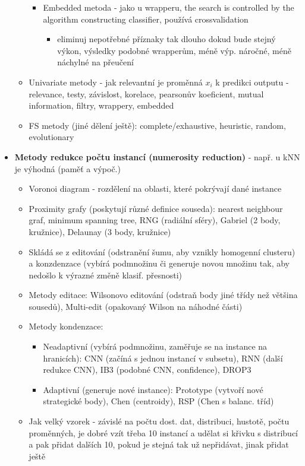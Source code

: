 \documentclass[a4paper,hidelinks]{article}
\begin{document}
\begin{itemize}
\begin{itemize}
\begin{itemize}
\begin{itemize}
                        \end{itemize}
                    \item Embedded metoda - jako u wrapperu, the search is controlled by the algorithm constructing classifier, používá crossvalidation
                        \begin{itemize}
                            \item eliminuj nepotřebné příznaky tak dlouho dokud bude stejný výkon, výsledky podobné wrapperům, méně výp. náročné, méně náchylné na přeučení
                        \end{itemize}
                \end{itemize}
            \item Univariate metody - jak relevantní je proměnná $x_i$ k predikci outputu - relevance, testy, závislost, korelace, pearsonův koeficient, mutual information, filtry, wrappery, embedded
            \item FS metody (jiné dělení ještě): complete/exhaustive, heuristic, random, evolutionary
        \end{itemize}
    \item \textbf{Metody redukce počtu instancí (numerosity reduction)} - např. u kNN je výhodná (paměť a výpoč.)
        \begin{itemize}
            \item Voronoi diagram - rozdělení na oblasti, které pokrývají dané instance
            \item Proximity grafy (poskytují různé definice souseda): nearest neighbour graf, minimum spanning tree, RNG (radiální sféry), Gabriel (2 body, kružnice), Delaunay (3 body, kružnice)
            \item Skládá se z editování (odstranění šumu, aby vznikly homogenní clusteru) a konzdenzace (vybírá podmnožinu či generuje novou množinu tak, aby nedošlo k výrazné změně klasif. přesnosti)
            \item Metody editace: Wilsonovo editování (odstraň body jiné třídy než většina sousedů), Multi-edit (opakovaný Wilson na náhodné části)
            \item Metody kondenzace:
                \begin{itemize}
                    \item Neadaptivní (vybírá podmnožinu, zaměřuje se na instance na hranicích): CNN (začíná s jednou instancí v subsetu), RNN (další redukce CNN), IB3 (podobné CNN, confidence), DROP3
                    \item Adaptivní (generuje nové instance): Prototype (vytvoří nové strategické body), Chen (centroidy), RSP (Chen s balanc. tříd)
                \end{itemize}
            \item Jak velký vzorek - závislé na počtu dost. dat, distribuci, hustotě, počtu proměnných, je dobré vzít třeba 10 instancí a udělat si křivku s distribucí a pak přidat dalších 10, pokud je stejná tak už nepřidávat, jinak přidat ještě
        \end{itemize}
    
\end{itemize}
\end{document}
